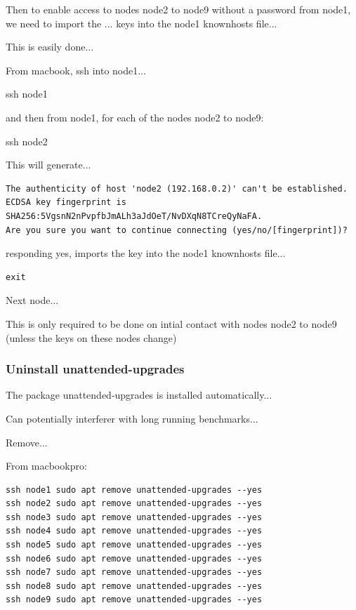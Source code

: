 \documentclass{article}
\begin{document}
Then to enable access to nodes node2 to node9 without a password from node1, we need to import the ... keys into the node1 knownhosts file...

This is easily done...

From macbook, ssh into node1...

ssh node1

and then from node1, for each of the nodes node2 to node9:

ssh node2

This will generate...

\begin{lstlisting}[frame=single]
The authenticity of host 'node2 (192.168.0.2)' can't be established.
ECDSA key fingerprint is SHA256:5VgsnN2nPvpfbJmALh3aJdOeT/NvDXqN8TCreQyNaFA.
Are you sure you want to continue connecting (yes/no/[fingerprint])?
\end{lstlisting}

responding yes, imports the key into the node1 knownhosts file...

\begin{lstlisting}[frame=single]
exit
\end{lstlisting}

Next node...

This is only required to be done on intial contact with nodes node2 to node9 (unless the keys on these nodes change)



\subsubsection{Uninstall unattended-upgrades}

The package unattended-upgrades is installed automatically...

Can potentially interferer with long running benchmarks...

Remove...

From macbookpro:

\begin{lstlisting}[frame=single]
ssh node1 sudo apt remove unattended-upgrades --yes
ssh node2 sudo apt remove unattended-upgrades --yes
ssh node3 sudo apt remove unattended-upgrades --yes
ssh node4 sudo apt remove unattended-upgrades --yes
ssh node5 sudo apt remove unattended-upgrades --yes
ssh node6 sudo apt remove unattended-upgrades --yes
ssh node7 sudo apt remove unattended-upgrades --yes
ssh node8 sudo apt remove unattended-upgrades --yes
ssh node9 sudo apt remove unattended-upgrades --yes
\end{lstlisting}
\end{document}
